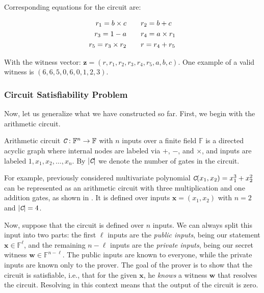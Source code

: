 \documentclass[../../book.tex]{subfiles}
\begin{document}
Corresponding equations for the circuit are:

\begin{equation*}
    \begin{aligned}
        r_1 = b \times c \hspace{10px} & & &
        r_2 = b + c \\
        r_3 = 1 - a \hspace{10px} & & &
        r_4 = a \times r_1 \\
        r_5 = r_3 \times r_2 \hspace{10px} & & &
        r = r_4 + r_5 \\
    \end{aligned}
\end{equation*}

With the witness vector: $\mathbf{z} = (r, r_1, r_2, r_3, r_4, r_5, a , b, c)$. One example of a valid witness is $(6, 6, 5, 0, 6, 0, 1, 2, 3)$.

\subsubsection{Circuit Satisfiability Problem}

Now, let us generalize what we have constructed so far. First, we begin with the arithmetic circuit.

\begin{definition}
    Arithmetic circuit $\textit{\texttt{C}}: \mathbb{F}^n \to \mathbb{F}$ with $n$ inputs over a finite field $\mathbb{F}$ is a directed acyclic graph where internal nodes are labeled via $+$, $-$, and $\times$, and inputs are labeled $1,x_1,x_2,\dots,x_n$. By $|\textit{\texttt{C}}|$ we denote the number of gates in the circuit.
\end{definition}

\begin{example}
    For example, previously considered multivariate polynomial $\textit{\texttt{C}}(x_1,x_2) = x_1^3 + x_2^2$ can be represented as an arithmetic circuit with three multiplication and one addition gates, as shown in . It is defined over inputs $\mathbf{x}=(x_1,x_2)$ with $n=2$ and $|\textit{\texttt{C}}| = 4$.
\end{example}

Now, suppose that the circuit is defined over $n$ inputs. We can always split
this input into two parts: the first $\ell$ inputs are the \textit{public
inputs}, being our statement $\mathbf{x} \in \mathbb{F}^{\ell}$, and the
remaining $n-\ell$ inputs are the \textit{private inputs}, being our secret
witness $\mathbf{w} \in \mathbb{F}^{n-\ell}$. The public inputs are known to
everyone, while the private inputs are known only to the prover. The goal of the
prover is to show that the circuit is satisfiable, i.e., that for the given
$\mathbf{x}$, he \textit{knows} a witness $\mathbf{w}$ that resolves the
circuit. Resolving in this context means that the output of the circuit is zero.
\end{document}
